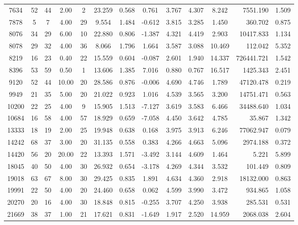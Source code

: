 \documentclass[mnsc]{informs3}
\begin{document}
\begin{APPENDICES}
\begin{longtable}{cccccccccccrc}
7634 & 52 & 44 & 2.00 & 2 & 23.259 & 0.568 & 0.761 & 3.767 & 4.307 & 8.242 & 7551.190 & 1.509 \\
7878 & 5 & 7 & 4.00 & 29 & 9.554 & 1.484 & -0.612 & 3.815 & 3.285 & 1.450 & 360.702 & 0.875 \\
8076 & 34 & 29 & 6.00 & 10 & 22.880 & 0.806 & -1.387 & 4.321 & 4.419 & 2.903 & 10417.833 & 1.134 \\
8078 & 29 & 32 & 4.00 & 36 & 8.066 & 1.796 & 1.664 & 3.587 & 3.088 & 10.469 & 112.042 & 5.352 \\
8219 & 16 & 23 & 0.40 & 22 & 15.559 & 0.604 & -0.087 & 2.601 & 1.940 & 14.337 & 726441.721 & 1.542 \\
8396 & 53 & 59 & 0.50 & 1 & 13.606 & 1.385 & 7.016 & 0.880 & 0.767 & 16.517 & 1425.343 & 2.451 \\
9120 & 52 & 44 & 10.00 & 20 & 28.586 & 0.876 & -0.006 & 4.690 & 4.746 & 1.789 & 47120.478 & 0.219 \\
9949 & 21 & 35 & 5.00 & 20 & 21.022 & 0.923 & 1.016 & 4.539 & 3.565 & 3.200 & 14751.471 & 0.563 \\
10200 & 22 & 25 & 4.00 & 9 & 15.905 & 1.513 & -7.127 & 3.619 & 3.583 & 6.466 & 34488.640 & 1.034 \\
10684 & 16 & 58 & 4.00 & 57 & 18.929 & 0.659 & -7.058 & 4.450 & 3.642 & 4.785 & 35.867 & 1.342 \\
13333 & 18 & 19 & 2.00 & 25 & 19.948 & 0.638 & 0.168 & 3.975 & 3.913 & 6.246 & 77062.947 & 0.079 \\
14242 & 68 & 37 & 3.00 & 20 & 31.135 & 0.558 & 0.383 & 4.266 & 4.663 & 5.096 & 2974.188 & 0.372 \\
14420 & 56 & 20 & 20.00 & 22 & 13.393 & 1.571 & -3.492 & 3.144 & 4.609 & 1.464 & 5.221 & 5.899 \\
18045 & 40 & 50 & 4.00 & 30 & 26.932 & 0.654 & -3.178 & 4.269 & 4.344 & 3.532 & 101.449 & 0.809 \\
19018 & 63 & 67 & 8.00 & 30 & 29.425 & 0.835 & 1.891 & 4.634 & 4.360 & 2.918 & 18132.000 & 0.863 \\
19991 & 22 & 50 & 4.00 & 20 & 24.460 & 0.658 & 0.062 & 4.599 & 3.990 & 3.472 & 934.865 & 1.058 \\
20270 & 20 & 16 & 4.00 & 30 & 18.848 & 0.815 & -0.255 & 3.707 & 4.250 & 3.938 & 285.531 & 0.531 \\
21669 & 38 & 37 & 1.00 & 21 & 17.621 & 0.831 & -1.649 & 1.917 & 2.520 & 14.959 & 2068.038 & 2.604 \\

\end{longtable}
\end{APPENDICES}
\end{document}
